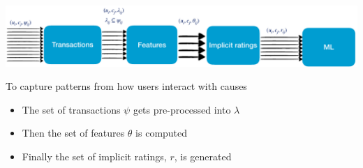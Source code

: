     
        \includegraphics[scale=0.25]{GraphicFiles/FromTransactionsToFeatures.png}
    
    \begin{block}{To capture patterns from how users interact with causes}
        \begin{itemize}
            \item The set of transactions $\psi$ gets pre-processed into $\lambda$
            \item Then the set of features $\theta{}$ is computed
            \item Finally the set of implicit ratings, $r$, is generated
        \end{itemize}
    \end{block}